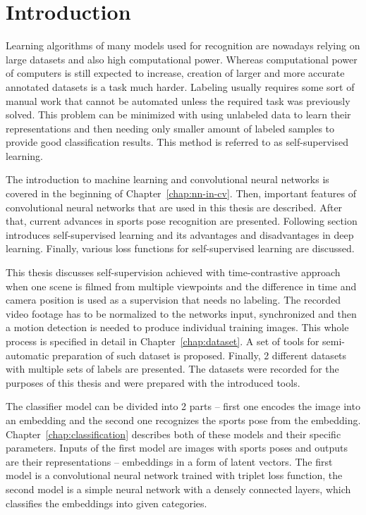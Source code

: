 \chapter{\label{chap:intro}Introduction}

Learning algorithms of many models used for recognition are nowadays relying on large datasets and also high computational power. Whereas computational power of computers is still expected to increase, creation of larger and more accurate annotated datasets is a task much harder. Labeling usually requires some sort of manual work that cannot be automated unless the required task was previously solved. This problem can be minimized with using unlabeled data to learn their representations and then needing only smaller amount of labeled samples to provide good classification results. This method is referred to as self-supervised learning.

The introduction to machine learning and convolutional neural networks is covered in the beginning of Chapter~\ref{chap:nn-in-cv}. Then, important features of convolutional neural networks that are used in this thesis are described. After that, current advances in sports pose recognition are presented. Following section introduces self-supervised learning and its advantages and disadvantages in deep learning. Finally, various loss functions for self-supervised learning are discussed.

This thesis discusses self-supervision achieved with time-contrastive approach when one scene is filmed from multiple viewpoints and the difference in time and camera position is used as a supervision that needs no labeling. The recorded video footage has to be normalized to the networks input, synchronized and then a motion detection is needed to produce individual training images. This whole process is specified in detail in Chapter~\ref{chap:dataset}. A set of tools for semi-automatic preparation of such dataset is proposed. Finally, 2 different datasets with multiple sets of labels are presented. The datasets were recorded for the purposes of this thesis and were prepared with the introduced tools.

The classifier model can be divided into 2 parts -- first one encodes the image into an embedding and the second one recognizes the sports pose from the embedding. Chapter~\ref{chap:classification} describes both of these models and their specific parameters. Inputs of the first model are images with sports poses and outputs are their representations -- embeddings in a form of latent vectors. The first model is a convolutional neural network trained with triplet loss function, the second model is a simple neural network with a densely connected layers, which classifies the embeddings into given categories.

